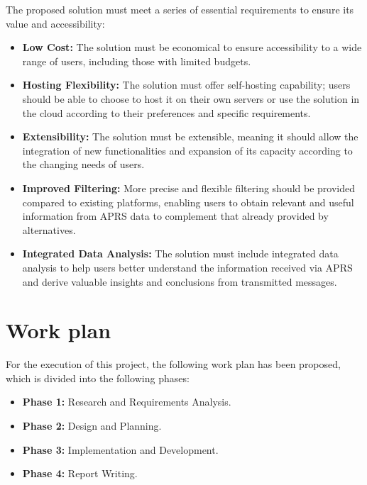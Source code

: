 The proposed solution must meet a series of essential requirements to ensure its value and accessibility:

\begin{itemize}
	\item \textbf{Low Cost:} The solution must be economical to ensure accessibility to a wide range of users, including those with limited budgets.

	\item \textbf{Hosting Flexibility:} The solution must offer self-hosting capability; users should be able to choose to host it on their own servers or use the solution in the cloud according to their preferences and specific requirements.

	\item \textbf{Extensibility:} The solution must be extensible, meaning it should allow the integration of new functionalities and expansion of its capacity according to the changing needs of users.
	
	\item \textbf{Improved Filtering:} More precise and flexible filtering should be provided compared to existing platforms, enabling users to obtain relevant and useful information from APRS data to complement that already provided by alternatives.
	
	\item \textbf{Integrated Data Analysis:} The solution must include integrated data analysis to help users better understand the information received via APRS and derive valuable insights and conclusions from transmitted messages.
	
\end{itemize}

\section{Work plan}

For the execution of this project, the following work plan has been proposed, which is divided into the following phases:

\begin{itemize}
	\item \textbf{Phase 1:} Research and Requirements Analysis.
	\item \textbf{Phase 2:} Design and Planning.
	\item \textbf{Phase 3:} Implementation and Development.
	\item \textbf{Phase 4:} Report Writing.
\end{itemize}

